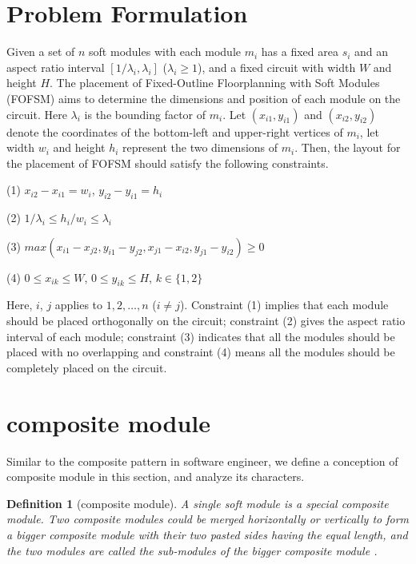 \documentclass[conference]{IEEEtran}
\begin{document}
\section{Problem Formulation}

Given a set of $n$ soft modules with each module $m_i$ has a fixed area $s_i$ and an aspect ratio interval $[1/\lambda_i,\lambda_i]$ ($\lambda_i \ge 1$), and a fixed circuit with width $W$ and height $H$. The placement of Fixed-Outline Floorplanning with Soft Modules (FOFSM) aims to determine the dimensions and position of each module on the circuit. Here $\lambda_i$ is the bounding factor of $m_i$. Let $(x_{i1},y_{i1})$ and $(x_{i2},y_{i2})$ denote the coordinates of the bottom-left and upper-right vertices of $m_i$, let width $w_i$ and height $h_i$ represent the two dimensions of $m_i$. Then, the layout for the placement of FOFSM should satisfy the following constraints.

(1) $x_{i2}-x_{i1} = w_i$, $y_{i2}-y_{i1} = h_i$

(2) $1/\lambda_i \le h_i/w_i \le \lambda_i $

(3) $max(x_{i1}-x_{j2}, y_{i1}-y_{j2}, x_{j1}-x_{i2}, y_{j1}-y_{i2}) \ge 0$

(4) $0 \le x_{ik} \le W$, $0 \le y_{ik} \le H$, $k \in \{1,2\}$

Here, $i$, $j$ applies to $1,2,\ldots,n$ ($i \ne j$). Constraint (1) implies that each module should be placed orthogonally on the circuit; constraint (2) gives the aspect ratio interval of each module; constraint (3) indicates that all the modules should be placed with no overlapping and constraint (4) means all the modules should be completely placed on the circuit.

\section{composite module}

Similar to the composite pattern in software engineer, we define a conception of composite module in this section, and analyze its characters.
\newtheorem{definition}{Definition}
\begin{definition}[composite module]
A single soft module is a special composite module. Two composite modules could be merged horizontally or vertically to form a bigger composite module with their two pasted sides having the equal length, and the two modules are called the sub-modules of the bigger composite module .
\end{definition}
\end{document}
